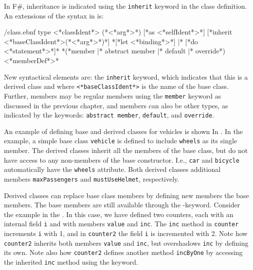 In F\#, inheritance is indicated using the \lstinline[language=syntax]{inherit} keyword in the class definition. An extensions of the syntax in  is:
%
\begin{verbatimwrite}{\ebnf/class.ebnf}
type <*classIdent*> ({*<*arg*>*}) [*as <*selfIdent*>*] 
  [*inherit <*baseClassIdent*>({*<*arg*>*})*]
  {*[*let <*binding*>*] |* [*do <*statement*>*]*}
  {*(*member |* abstract member |* default |* override*) <*memberDef*>*}
\end{verbatimwrite}
%
New syntactical elements are: the  \lstinline{inherit} keyword, which indicates that this is a derived class and where \lstinline[language=syntax]{<*baseClassIdent*>} is the name of the base class. Further, members may be regular members using the \lstinline{member} keyword as discussed in the previous chapter, and members can also be other types, as indicated by the keywords: \lstinline{abstract member}, \lstinline{default}, and \lstinline{override}.

An example of defining base and derived classes for vehicles is shown In .
%
%
In the example, a simple base class \lstinline{vehicle} is defined to include \lstinline{wheels} as its single member. The derived classes inherit all the members of the base class, but do not have access to any non-members of the base constructor. I.e., \lstinline{car} and \lstinline{bicycle} automatically have the \lstinline{wheels} attribute. Both derived classes additional members \lstinline{maxPassengers} and \lstinline{mustUseHelmet}, respectively.

Derived classes can replace base class members by defining new members  the base members. The base members are still available through the -keyword. Consider the example in the .
%
%
In this case, we have defined two counters, each with an internal field \lstinline{i} and with members \lstinline{value} and \lstinline{inc}. The \lstinline{inc} method in \lstinline{counter} increments \lstinline{i} with 1, and in \lstinline{counter2} the field \lstinline{i} is incremented with 2. Note how \lstinline{counter2} inherits both members \lstinline{value} and \lstinline{inc}, but overshadows \lstinline{inc} by defining its own. Note also how \lstinline{counter2} defines another method \lstinline{incByOne} by accessing the inherited \lstinline{inc} method using the  keyword.

